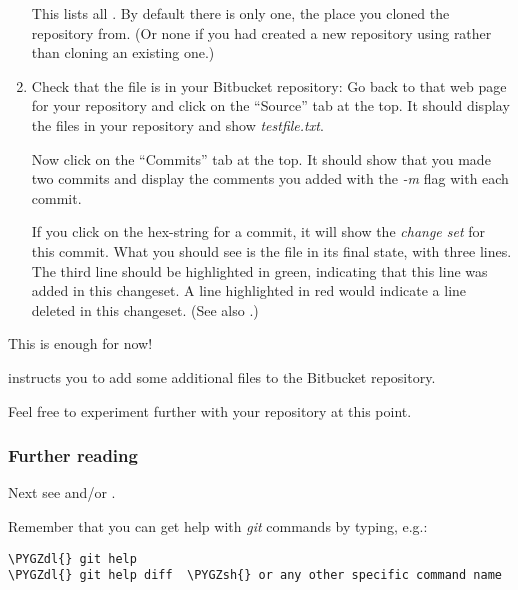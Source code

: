 \documentclass[letterpaper,10pt,english]{sphinxmanual}
\def\PYGZsh{\char`\#}
\def\PYGZdl{\char`\$}
\begin{document}
\begin{enumerate}
This lists all .
By default there is only one, the place you cloned the repository from.
(Or none if you had created a new repository using  rather
than cloning an existing one.)

\item {} 
Check that the file is in your Bitbucket repository:  Go back to that web
page for your repository and click on the  ``Source'' tab at the top.  It
should display the files in your repository and show \emph{testfile.txt}.

Now click on the ``Commits'' tab at the top.  It should show that you
made two commits and display the comments you added with the \emph{-m} flag
with each commit.

If you click on the hex-string for a commit, it will show the
\emph{change set} for this commit.  What you
should see is the file in its final state, with three lines.  The third
line should be highlighted in green, indicating that this line was added
in this changeset.  A line highlighted in red would indicate a line deleted
in this changeset.  (See also {\hyperref[bitbucket:bitbucket]{}}.)

\end{enumerate}

This is enough for now!

 instructs you to add some additional files to the Bitbucket
repository.

Feel free to experiment further with your repository at this point.


\subsubsection{Further reading}
\label{2013/git:further-reading}
Next see {\hyperref[bitbucket:bitbucket]{}} and/or {\hyperref[git_more:git\string-more]{}}.

Remember that you can get help with \emph{git} commands by typing, e.g.:

\begin{Verbatim}[commandchars=\\\{\}]
\PYGZdl{} git help
\PYGZdl{} git help diff  \PYGZsh{} or any other specific command name
\end{Verbatim}
\end{document}
